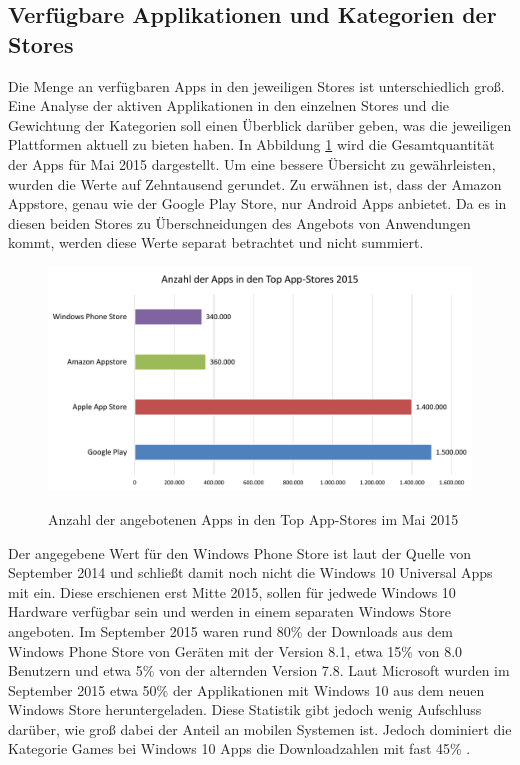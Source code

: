 \subsection{Verfügbare Applikationen und Kategorien der Stores}
Die Menge an verfügbaren Apps in den jeweiligen Stores ist unterschiedlich groß.
Eine Analyse der aktiven Applikationen in den einzelnen Stores und die Gewichtung der Kategorien soll einen Überblick darüber geben, was die jeweiligen Plattformen aktuell zu bieten haben.
In Abbildung \ref{graph_apps_in_stores} wird die Gesamtquantität der Apps für Mai 2015 dargestellt. Um eine bessere Übersicht zu gewährleisten, wurden die Werte auf Zehntausend gerundet. Zu erwähnen ist, dass der Amazon Appstore, genau wie der Google Play Store, nur Android Apps anbietet. Da es in diesen beiden Stores zu Überschneidungen des Angebots von Anwendungen kommt, werden diese Werte separat betrachtet und nicht summiert.

\begin{figure}[htbp]
	\centering
	\includegraphics[width=1\textwidth]{Bilder/Anzahl_der_Apps}
	\caption{Anzahl der angebotenen Apps in den Top App-Stores im Mai 2015}\label{graph_apps_in_stores}\citep{apps_in_stores}
\end{figure}

Der angegebene Wert für den Windows Phone Store ist laut der Quelle von September 2014 und schließt damit noch nicht die Windows 10 Universal Apps mit ein. Diese erschienen erst Mitte 2015, sollen für jedwede Windows 10 Hardware verfügbar sein und werden in einem separaten Windows Store angeboten. Im September 2015 waren rund 80\% der Downloads aus dem Windows Phone Store von Geräten mit der Version 8.1, etwa 15\% von 8.0 Benutzern und etwa 5\% von der alternden Version 7.8.
Laut Microsoft wurden im September 2015 etwa 50\% der Applikationen mit Windows 10 aus dem neuen Windows Store heruntergeladen. Diese Statistik gibt jedoch wenig Aufschluss darüber, wie groß dabei der Anteil an mobilen Systemen ist. Jedoch dominiert die Kategorie Games bei Windows 10 Apps die Downloadzahlen mit fast 45\% \citep{windows_store_trends_2015}.


